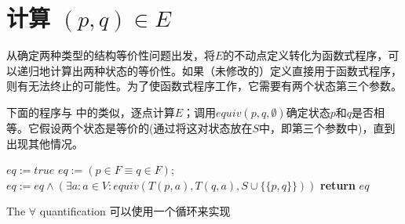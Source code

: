 \section{计算 $ (p,q) \in E $}

从确定两种类型的结构等价性问题出发，将$E$的不动点定义转化为函数式程序，可以递归地计算出两种状态的等价性。如果（未修改的）定义直接用于函数式程序，则有无法终止的可能性。为了使函数式程序工作，它需要有两个状态第三个参数。

下面的程序与 \cite{t-Ei91} 中的类似，逐点计算$E$；调用$equiv(p,q,\emptyset)$确定状态$p$和$q$是否相等。它假设两个状态是等价的(通过将这对状态放在$S$中，即第三个参数中)，直到出现其他情况。

\begin{algorithm}
    \small
    \begin{algorithmic}[1]
                $eq := true$
                \State $ eq := ( p \in F \equiv q \in F ) $;
                \State $ eq := eq \land (\exists a:a \in V : equiv (T(p,a),T(q,a),S \cup \{ \{ p,q\} \}  ) )  $
            \EndIf
            \State \textbf{return} $eq$
        \EndFunction
    \end{algorithmic}
\end{algorithm}


The $\forall$ quantification 可以使用一个循环来实现

